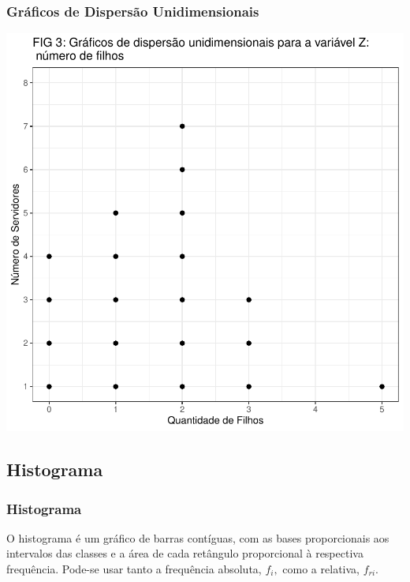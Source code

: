 \documentclass[14pt,aspectratio=1610]{beamer}
\begin{document}
\begin{frame}{}
\frametitle{Gráficos de Dispersão Unidimensionais}
\begin{block}{}
	\vspace{-0.5cm}
\begin{center}
\includegraphics{Aula5-point2}
\end{center}
\end{block}
\end{frame}


\subsection{Histograma}
\begin{frame}{}
\frametitle{Histograma}
\begin{block}{}
\justifying
O histograma é um gráfico de barras contíguas, com as bases proporcionais aos intervalos
das classes e a área de cada retângulo proporcional à respectiva frequência. Pode-se
usar tanto a frequência absoluta, $f_{i},$ como a relativa, $f_{ri}.$
\end{block}
\end{frame}
\end{document}
